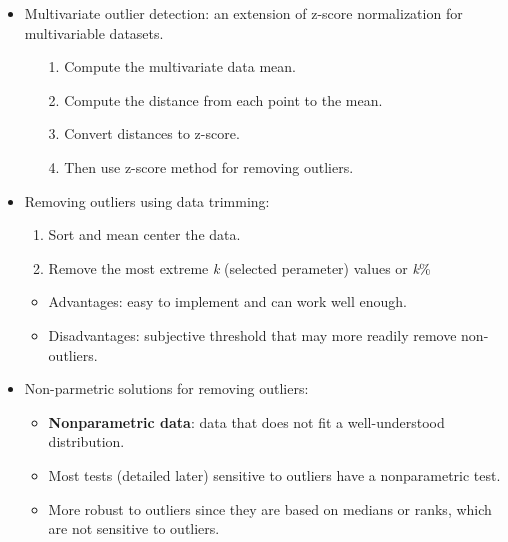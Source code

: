 \documentclass[12pt,a4paper]{article}
\begin{document}
\begin{itemize}
\begin{itemize}
\begin{itemize}
                \end{itemize}
        \end{itemize}
    \item Multivariate outlier detection: an extension of z-score normalization for multivariable datasets.
        \begin{itemize}
            \item[1.] Compute the multivariate data mean.
            \item[2.] Compute the distance from each point to the mean.
            \item[3.] Convert distances to z-score.
            \item[4.] Then use z-score method for removing outliers.
        \end{itemize}
    \item Removing outliers {\color{o-Sun}using data trimming}: 
        \begin{enumerate}
            \item Sort and mean center the data.
            \item Remove the most extreme \textit{k} (selected perameter) values or \textit{k}\%
        \end{enumerate}
        \begin{itemize}
            \item Advantages: easy to implement and can work well enough.
            \item Disadvantages: subjective threshold that may more readily remove non-outliers.
        \end{itemize}
    \item Non-parmetric solutions for removing outliers:
        \begin{itemize}
            \item \textbf{Nonparametric data}: data that does not fit a well-understood distribution. 
            \item Most tests (detailed later) sensitive to outliers have a nonparametric test.
            \item More robust to outliers since they are based on medians or ranks, which are not sensitive to outliers.
        \end{itemize}
\end{itemize}
\end{document}
